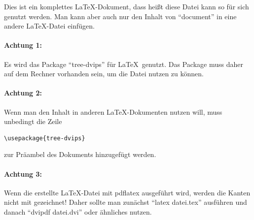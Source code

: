 Dies ist ein komplettes \LaTeX-Dokument, dass heißt diese Datei kann so für sich genutzt werden. Man kann aber auch nur den Inhalt von "`document"' in eine andere \LaTeX-Datei einfügen.

\paragraph*{Achtung 1:} Es wird das Package "`tree-dvips"' für \LaTeX\ genutzt. Das Package muss daher auf dem Rechner vorhanden sein, um die Datei nutzen zu können.

\paragraph*{Achtung 2:} Wenn man den Inhalt in anderen \LaTeX-Dokumenten nutzen will, muss unbedingt die Zeile
\begin{verbatim}
\usepackage{tree-dvips}
\end{verbatim}
zur Präambel des Dokuments hinzugefügt werden.

\paragraph*{Achtung 3:} Wenn die erstellte \LaTeX-Datei mit pdflatex ausgeführt wird, werden die Kanten nicht mit gezeichnet! Daher sollte man zunächst "`latex datei.tex"' ausführen und danach "`dvipdf datei.dvi"' oder ähnliches nutzen.
